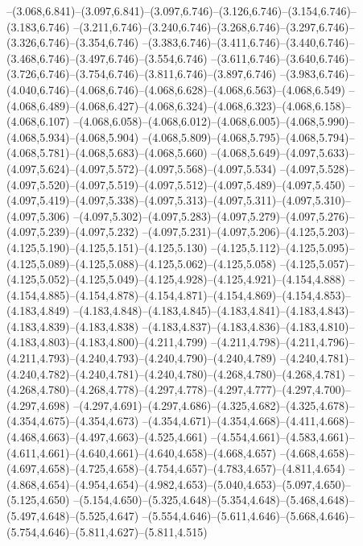   --(3.068,6.841)--(3.097,6.841)--(3.097,6.746)--(3.126,6.746)--(3.154,6.746)--(3.183,6.746)%
  --(3.211,6.746)--(3.240,6.746)--(3.268,6.746)--(3.297,6.746)--(3.326,6.746)--(3.354,6.746)%
  --(3.383,6.746)--(3.411,6.746)--(3.440,6.746)--(3.468,6.746)--(3.497,6.746)--(3.554,6.746)%
  --(3.611,6.746)--(3.640,6.746)--(3.726,6.746)--(3.754,6.746)--(3.811,6.746)--(3.897,6.746)%
  --(3.983,6.746)--(4.040,6.746)--(4.068,6.746)--(4.068,6.628)--(4.068,6.563)--(4.068,6.549)%
  --(4.068,6.489)--(4.068,6.427)--(4.068,6.324)--(4.068,6.323)--(4.068,6.158)--(4.068,6.107)%
  --(4.068,6.058)--(4.068,6.012)--(4.068,6.005)--(4.068,5.990)--(4.068,5.934)--(4.068,5.904)%
  --(4.068,5.809)--(4.068,5.795)--(4.068,5.794)--(4.068,5.781)--(4.068,5.683)--(4.068,5.660)%
  --(4.068,5.649)--(4.097,5.633)--(4.097,5.624)--(4.097,5.572)--(4.097,5.568)--(4.097,5.534)%
  --(4.097,5.528)--(4.097,5.520)--(4.097,5.519)--(4.097,5.512)--(4.097,5.489)--(4.097,5.450)%
  --(4.097,5.419)--(4.097,5.338)--(4.097,5.313)--(4.097,5.311)--(4.097,5.310)--(4.097,5.306)%
  --(4.097,5.302)--(4.097,5.283)--(4.097,5.279)--(4.097,5.276)--(4.097,5.239)--(4.097,5.232)%
  --(4.097,5.231)--(4.097,5.206)--(4.125,5.203)--(4.125,5.190)--(4.125,5.151)--(4.125,5.130)%
  --(4.125,5.112)--(4.125,5.095)--(4.125,5.089)--(4.125,5.088)--(4.125,5.062)--(4.125,5.058)%
  --(4.125,5.057)--(4.125,5.052)--(4.125,5.049)--(4.125,4.928)--(4.125,4.921)--(4.154,4.888)%
  --(4.154,4.885)--(4.154,4.878)--(4.154,4.871)--(4.154,4.869)--(4.154,4.853)--(4.183,4.849)%
  --(4.183,4.848)--(4.183,4.845)--(4.183,4.841)--(4.183,4.843)--(4.183,4.839)--(4.183,4.838)%
  --(4.183,4.837)--(4.183,4.836)--(4.183,4.810)--(4.183,4.803)--(4.183,4.800)--(4.211,4.799)%
  --(4.211,4.798)--(4.211,4.796)--(4.211,4.793)--(4.240,4.793)--(4.240,4.790)--(4.240,4.789)%
  --(4.240,4.781)--(4.240,4.782)--(4.240,4.781)--(4.240,4.780)--(4.268,4.780)--(4.268,4.781)%
  --(4.268,4.780)--(4.268,4.778)--(4.297,4.778)--(4.297,4.777)--(4.297,4.700)--(4.297,4.698)%
  --(4.297,4.691)--(4.297,4.686)--(4.325,4.682)--(4.325,4.678)--(4.354,4.675)--(4.354,4.673)%
  --(4.354,4.671)--(4.354,4.668)--(4.411,4.668)--(4.468,4.663)--(4.497,4.663)--(4.525,4.661)%
  --(4.554,4.661)--(4.583,4.661)--(4.611,4.661)--(4.640,4.661)--(4.640,4.658)--(4.668,4.657)%
  --(4.668,4.658)--(4.697,4.658)--(4.725,4.658)--(4.754,4.657)--(4.783,4.657)--(4.811,4.654)%
  --(4.868,4.654)--(4.954,4.654)--(4.982,4.653)--(5.040,4.653)--(5.097,4.650)--(5.125,4.650)%
  --(5.154,4.650)--(5.325,4.648)--(5.354,4.648)--(5.468,4.648)--(5.497,4.648)--(5.525,4.647)%
  --(5.554,4.646)--(5.611,4.646)--(5.668,4.646)--(5.754,4.646)--(5.811,4.627)--(5.811,4.515)%
